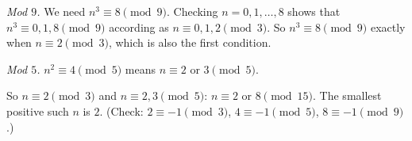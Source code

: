 \emph{Mod $9$.} We need $n^3\equiv 8\pmod 9$. Checking $n=0,1,\dots,8$ shows that $n^3\equiv 0,1,8\pmod 9$ according as $n\equiv0,1,2\pmod3$. So $n^3\equiv8\pmod9$ exactly when $n\equiv2\pmod3$, which is also the first condition.

\emph{Mod $5$.} $n^2\equiv4\pmod5$ means $n\equiv2$ or $3\pmod5$.

So $n\equiv 2\pmod 3$ and $n\equiv 2,3\pmod 5$: $n\equiv2$ or $8\pmod{15}$. The smallest positive such $n$ is $\boxed{2}$. (Check: $2\equiv-1\pmod 3$, $4\equiv-1\pmod5$, $8\equiv-1\pmod9$.)
